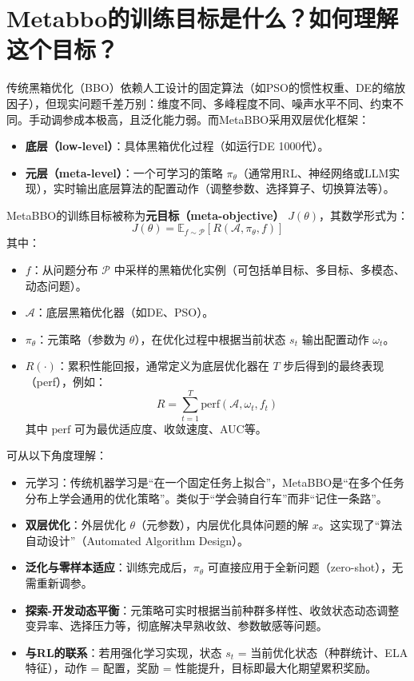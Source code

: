 \documentclass[12pt,a4paper,UTF8]{ctexart}
\begin{document}
\section{Metabbo的训练目标是什么？如何理解这个目标？}
传统黑箱优化（BBO）依赖人工设计的固定算法（如PSO的惯性权重、DE的缩放因子），但现实问题千差万别：维度不同、多峰程度不同、噪声水平不同、约束不同。手动调参成本极高，且泛化能力弱。而MetaBBO采用双层优化框架：
\begin{itemize}
    \item \textbf{底层（low-level）}：具体黑箱优化过程（如运行DE 1000代）。
    \item \textbf{元层（meta-level）}：一个可学习的策略 \(\pi_\theta\)（通常用RL、神经网络或LLM实现），实时输出底层算法的配置动作（调整参数、选择算子、切换算法等）。
\end{itemize}
MetaBBO的训练目标被称为\textbf{元目标（meta-objective）} \( J(\theta) \)，其数学形式为：
\[
J(\theta) = \mathbb{E}_{f \sim \mathcal{P}} \left[ R(\mathcal{A}, \pi_\theta, f) \right]
\]
其中：
\begin{itemize}
    \item \( f \)：从问题分布 \(\mathcal{P}\) 中采样的黑箱优化实例（可包括单目标、多目标、多模态、动态问题）。
    \item \(\mathcal{A}\)：底层黑箱优化器（如DE、PSO）。
    \item \(\pi_\theta\)：元策略（参数为 \(\theta\)），在优化过程中根据当前状态 \( s_t \) 输出配置动作 \(\omega_t\)。
    \item \( R(\cdot) \)：累积性能回报，通常定义为底层优化器在 \( T \) 步后得到的最终表现（perf），例如：
    \[
    R = \sum_{t=1}^{T} \text{perf}(\mathcal{A}, \omega_t, f_t)
    \]
    其中 \(\text{perf}\) 可为最优适应度、收敛速度、AUC等。
\end{itemize}
可从以下角度理解：
\begin{itemize}
    \item 元学习：传统机器学习是“在一个固定任务上拟合”，MetaBBO是“在多个任务分布上学会通用的优化策略”。类似于“学会骑自行车”而非“记住一条路”。
    \item \textbf{双层优化}：外层优化 \(\theta\)（元参数），内层优化具体问题的解 \( x \)。这实现了“算法自动设计”（Automated Algorithm Design）。
    \item \textbf{泛化与零样本适应}：训练完成后，\(\pi_\theta\) 可直接应用于全新问题（zero-shot），无需重新调参。
    \item \textbf{探索-开发动态平衡}：元策略可实时根据当前种群多样性、收敛状态动态调整变异率、选择压力等，彻底解决早熟收敛、参数敏感等问题。
    \item \textbf{与RL的联系}：若用强化学习实现，状态 \( s_t \) = 当前优化状态（种群统计、ELA特征），动作 = 配置，奖励 = 性能提升，目标即最大化期望累积奖励。
\end{itemize}
\end{document}
